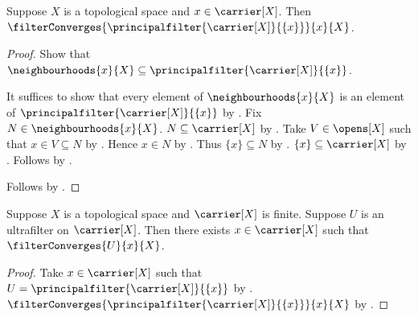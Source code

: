 \begin{proposition}\label{principal_ultrafilter_converges}
    Suppose $X$ is a topological space and $x\in\carrier[X]$.
    Then $\filterConverges{\principalfilter{\carrier[X]}{\{x\}}}{x}{X}$.
\end{proposition}
\begin{proof}
    Show that $\neighbourhoods{x}{X}
        \subseteq\principalfilter{\carrier[X]}{\{x\}}$.
    \begin{subproof}
        It suffices to show that every element of
            $\neighbourhoods{x}{X}$ is an element of
            $\principalfilter{\carrier[X]}{\{x\}}$
            by .
        Fix $N\in\neighbourhoods{x}{X}$.
        $N\subseteq\carrier[X]$ by
            .
        Take $V\in\opens[X]$ such that $x\in V\subseteq N$
            by .
        Hence $x\in N$ by .
        Thus $\{x\}\subseteq N$ by .
        $\{x\}\subseteq\carrier[X]$
            by .
        Follows by .
    \end{subproof}
    Follows by .
\end{proof}

\begin{theorem}\label{ultrafilter_on_finite_space_converges}
    Suppose $X$ is a topological space and $\carrier[X]$ is finite.
    Suppose $U$ is an ultrafilter on $\carrier[X]$.
    Then there exists $x\in\carrier[X]$ such that
        $\filterConverges{U}{x}{X}$.
\end{theorem}
\begin{proof}
    Take $x\in\carrier[X]$ such that
        $U=\principalfilter{\carrier[X]}{\{x\}}$
        by .
    $\filterConverges{\principalfilter{\carrier[X]}{\{x\}}}{x}{X}$
        by .
\end{proof}
